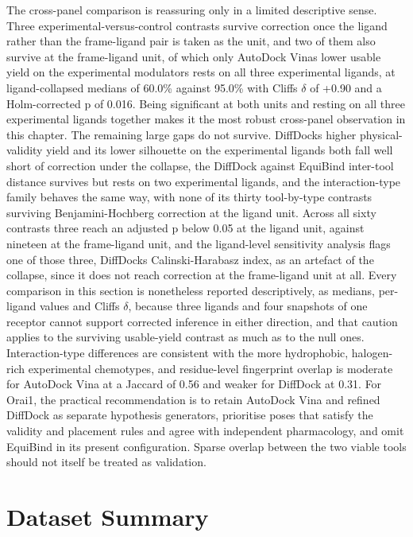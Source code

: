 The cross-panel comparison is reassuring only in a limited descriptive sense. Three experimental-versus-control contrasts survive correction once the ligand rather than the frame-ligand pair is taken as the unit, and two of them also survive at the frame-ligand unit, of which only AutoDock Vina\textquotesingle s lower usable yield on the experimental modulators rests on all three experimental ligands, at ligand-collapsed medians of 60.0\% against 95.0\% with Cliff\textquotesingle s \ensuremath{\delta} of +0.90 and a Holm-corrected p of 0.016. Being significant at both units and resting on all three experimental ligands together makes it the most robust cross-panel observation in this chapter. The remaining large gaps do not survive. DiffDock\textquotesingle s higher physical-validity yield and its lower silhouette on the experimental ligands both fall well short of correction under the collapse, the DiffDock against EquiBind inter-tool distance survives but rests on two experimental ligands, and the interaction-type family behaves the same way, with none of its thirty tool-by-type contrasts surviving Benjamini-Hochberg correction at the ligand unit. Across all sixty contrasts three reach an adjusted p below 0.05 at the ligand unit, against nineteen at the frame-ligand unit, and the ligand-level sensitivity analysis flags one of those three, DiffDock\textquotesingle s Calinski-Harabasz index, as an artefact of the collapse, since it does not reach correction at the frame-ligand unit at all. Every comparison in this section is nonetheless reported descriptively, as medians, per-ligand values and Cliff\textquotesingle s \ensuremath{\delta}, because three ligands and four snapshots of one receptor cannot support corrected inference in either direction, and that caution applies to the surviving usable-yield contrast as much as to the null ones. Interaction-type differences are consistent with the more hydrophobic, halogen-rich experimental chemotypes, and residue-level fingerprint overlap is moderate for AutoDock Vina at a Jaccard of 0.56 and weaker for DiffDock at 0.31. For Orai1, the practical recommendation is to retain AutoDock Vina and refined DiffDock as separate hypothesis generators, prioritise poses that satisfy the validity and placement rules and agree with independent pharmacology, and omit EquiBind in its present configuration. Sparse overlap between the two viable tools should not itself be treated as validation.

\protect\hypertarget{_Toc235735941}{}{}

\hypertarget{dataset-summary}{%
\section{Dataset Summary}\label{dataset-summary}}


